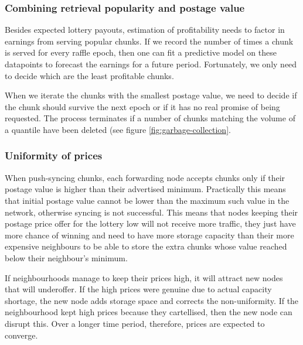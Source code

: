 \subsubsection{Combining retrieval popularity and postage value}

Besides expected lottery payouts, estimation of profitability needs to factor in earnings from serving popular chunks. If we record the number of times a chunk is served for every raffle epoch, then one can fit a predictive model on these datapoints to forecast the earnings for a future period. Fortunately, we only need to decide which are the least profitable chunks. 



When we iterate the chunks with the smallest  postage value, we need to decide if the chunk should survive the next epoch or if it has no real promise of being requested. The process terminates if a number of chunks matching the volume of a quantile have been deleted (see figure \ref{fig:garbage-collection}.

\subsubsection{Uniformity of prices} 

When push-syncing chunks, each forwarding node accepts chunks only if their postage value is higher than their advertised minimum. Practically this means that initial postage value cannot be lower than the maximum such value in the network, otherwise syncing is not successful. This means that nodes keeping their postage price offer for the lottery low will not receive more traffic, they just have more chance of winning and need to have more storage capacity than their more expensive neighbours to be able to store the extra chunks whose value reached below their neighbour's minimum.

If neighbourhoods manage to keep their prices high, it will attract new nodes that will underoffer. If the high prices were genuine due to actual capacity shortage, the new node adds storage space and corrects the non-uniformity. If the neighbourhood kept high prices because they cartellised, then the new node can disrupt this. Over a longer time period, therefore, prices are expected to converge.



